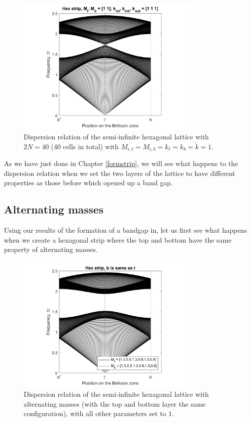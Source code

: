 \begin{figure}[!h]
\centering
\includegraphics[width=0.8\textwidth]{imgs/hexstrip.png}
\caption{\label{fig:hexstripdisper} Dispersion relation of the semi-infinite
  hexagonal lattice with $2N=40$ (40 cells in total) with
  $M_{i,t}=M_{i,b}=k_t=k_b=\tilde{k}=1$.}
\end{figure}

As we have just done in Chapter \ref{formstrip}, we will see what happens to
the dispersion relation when we set the two layers of the lattice to have
different properties as those before which opened up a band gap.

\subsection{Alternating masses}
\label{perturbaltmass}
Using our results of the formation of a bandgap in, let us first see what
happens when we create a hexagonal strip where the top and bottom have the same
property of alternating masses. 

\begin{figure}[!h]
\centering
\includegraphics[width=0.8\textwidth]{imgs/hexstripperturbM.png}
\caption{\label{fig:hexstripM} Dispersion relation of the semi-infinite
  hexagonal lattice with alternating masses (with the top and bottom layer the
  same configuration), with all other parameters set to $1$.}
\end{figure}

